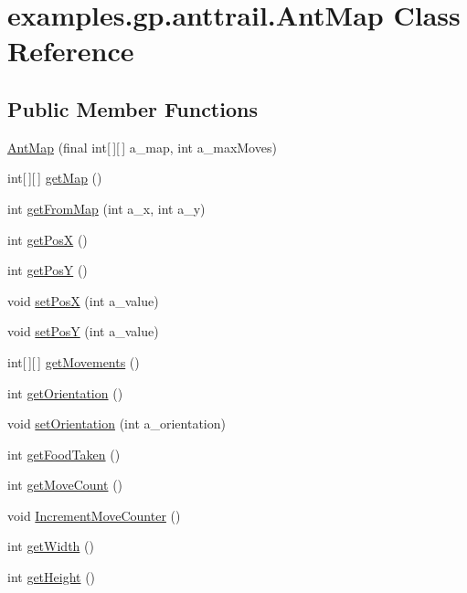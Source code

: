 \hypertarget{classexamples_1_1gp_1_1anttrail_1_1_ant_map}{\section{examples.\-gp.\-anttrail.\-Ant\-Map Class Reference}
\label{classexamples_1_1gp_1_1anttrail_1_1_ant_map}
}
\subsection*{Public Member Functions}
\begin{DoxyCompactItemize}
\item 
\hyperlink{classexamples_1_1gp_1_1anttrail_1_1_ant_map_a659ac2b9f81a55d17fb2e236574c8c70}{Ant\-Map} (final int\mbox{[}$\,$\mbox{]}\mbox{[}$\,$\mbox{]} a\-\_\-map, int a\-\_\-max\-Moves)
\item 
int\mbox{[}$\,$\mbox{]}\mbox{[}$\,$\mbox{]} \hyperlink{classexamples_1_1gp_1_1anttrail_1_1_ant_map_a87323b6d1e483119c290dc10fc53ae2f}{get\-Map} ()
\item 
int \hyperlink{classexamples_1_1gp_1_1anttrail_1_1_ant_map_a0b34b7b4b061f25e777bf58e846d3ac6}{get\-From\-Map} (int a\-\_\-x, int a\-\_\-y)
\item 
int \hyperlink{classexamples_1_1gp_1_1anttrail_1_1_ant_map_ae926ee02f20b2c3a08df584bac5d7cb5}{get\-Pos\-X} ()
\item 
int \hyperlink{classexamples_1_1gp_1_1anttrail_1_1_ant_map_a0b9e9000c1ad2382ade65951912042c2}{get\-Pos\-Y} ()
\item 
void \hyperlink{classexamples_1_1gp_1_1anttrail_1_1_ant_map_ae407e488cb3dce9ced924c391c974b37}{set\-Pos\-X} (int a\-\_\-value)
\item 
void \hyperlink{classexamples_1_1gp_1_1anttrail_1_1_ant_map_a5d4618cbeb6e6c73ec2f716778dc0222}{set\-Pos\-Y} (int a\-\_\-value)
\item 
int\mbox{[}$\,$\mbox{]}\mbox{[}$\,$\mbox{]} \hyperlink{classexamples_1_1gp_1_1anttrail_1_1_ant_map_af2e73db218ea97a110b0e32b3092a4f1}{get\-Movements} ()
\item 
int \hyperlink{classexamples_1_1gp_1_1anttrail_1_1_ant_map_a5d21717cc2f62b12f2dc22ea6ada24a8}{get\-Orientation} ()
\item 
void \hyperlink{classexamples_1_1gp_1_1anttrail_1_1_ant_map_a1b12f28b0b0de76420758049ebedd3e0}{set\-Orientation} (int a\-\_\-orientation)
\item 
int \hyperlink{classexamples_1_1gp_1_1anttrail_1_1_ant_map_a3f80865f0cdd8d301fae463bf36ae2f7}{get\-Food\-Taken} ()
\item 
int \hyperlink{classexamples_1_1gp_1_1anttrail_1_1_ant_map_a7fb6a60ba24679ab45d2d629f0b227dc}{get\-Move\-Count} ()
\item 
void \hyperlink{classexamples_1_1gp_1_1anttrail_1_1_ant_map_a83b28e68b68037838de3c251b0545cf5}{Increment\-Move\-Counter} ()
\item 
int \hyperlink{classexamples_1_1gp_1_1anttrail_1_1_ant_map_ab330f691f5376c7d901ef57c3504a94f}{get\-Width} ()
\item 
int \hyperlink{classexamples_1_1gp_1_1anttrail_1_1_ant_map_aae92b7a721a76d4cbce5d8ba030899a3}{get\-Height} ()
\end{DoxyCompactItemize}
